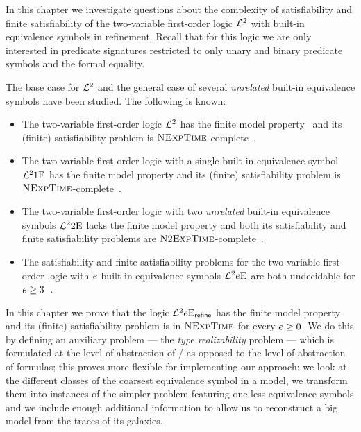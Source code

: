 In this chapter we investigate questions about the complexity of satisfiability
and finite satisfiability of the two-variable first-order logic $\mathcal{L}^{2}$ with
built-in equivalence symbols in refinement. Recall that for this logic we are
only interested in predicate signatures restricted to only unary and binary
predicate symbols and the formal equality.

The base case for $\mathcal{L}^{2}$ and the general case of several \emph{unrelated}
built-in equivalence symbols have been studied. The following is known:
\begin{itemize}
  \item The two-variable first-order logic $\mathcal{L}^{2}$ has the finite model
  property~\cite{MALQ:MALQ19750210118} and its (finite) satisfiability problem
  is $\text{\normalfont{\scshape NExpTime}}$-complete~\cite{gradel1997decision}.
  \item The two-variable first-order logic with a single built-in equivalence
  symbol $\mathcal{L}^{2}{1}\mathrm{E}_{{}}$ has the finite model property and its (finite)
  satisfiability problem is $\text{\normalfont{\scshape NExpTime}}$-complete~\cite{kieronski2005results}.
  \item The two-variable first-order logic with two \emph{unrelated} built-in
  equivalence symbols $\mathcal{L}^{2}{2}\mathrm{E}_{{}}$ lacks the finite model property and both
  its satisfiability and finite satisfiability problems are
  $\text{\normalfont{\scshape N}}2\text{\normalfont{\scshape ExpTime}}$-complete~\cite{doi:10.1137/120900095}.
  \item The satisfiability and finite satisfiability problems for
  the two-variable first-order logic with $e$ built-in equivalence symbols
  $\mathcal{L}^{2}{e}\mathrm{E}_{{}}$ are both undecidable for $e \geq
  3$~\cite{kieronski2005small}.
\end{itemize}

In this chapter we prove that the logic $\mathcal{L}^{2}{e}\mathrm{E}_{\mathsf{refine}}$ has the finite
model property and its (finite) satisfiability problem is in $\text{\normalfont{\scshape NExpTime}}$ for
every $e \geq 0$.
We do this by defining an auxiliary problem --- the \emph{type realizability}
problem --- which is formulated at the level of abstraction of \twotypes/ as
opposed to the level of abstraction of formulas; this proves more flexible for
implementing our approach: we look at the different classes of the coarsest
equivalence symbol in a model, we transform them into instances of the simpler
problem featuring one less equivalence symbols and we include enough additional
information to allow us to reconstruct a big model from the traces of its
galaxies.